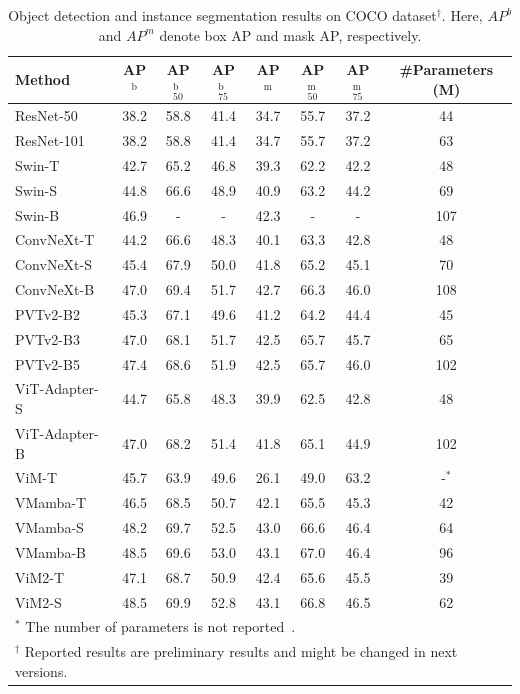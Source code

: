 \documentclass{article}
\begin{document}
\begin{table}[t]
\centering
\caption{{Object detection and instance segmentation results on COCO dataset$^\dagger$}. Here, $AP^{b}$ and $AP^{m}$ denote box AP and mask AP, respectively.
}
\resizebox{.90\linewidth}{!}
{
\begin{tabular}{l ccc ccc c}
\toprule
Method & AP$^\text{b}$ & AP$^\text{b}_\text{50}$ & AP$^\text{b}_\text{75}$ & AP$^\text{m}$ & AP$^\text{m}_\text{50}$ & AP$^\text{m}_\text{75}$ & \#Parameters (M)  \\
\midrule
ResNet-50~\citep{He2016resnet} & 38.2 & 58.8 & 41.4 & 34.7 & 55.7 & 37.2 & 44 \\
ResNet-101~\citep{He2016resnet} & 38.2 & 58.8 & 41.4 & 34.7 & 55.7 & 37.2 & 63 \\
\midrule
Swin-T~\citep{liu2021swin} & 42.7 & 65.2 & 46.8 & 39.3 & 62.2 & 42.2 & 48 \\
Swin-S~\citep{liu2021swin} & 44.8 & 66.6 & 48.9 & 40.9 & 63.2 & 44.2 & 69 \\
Swin-B~\citep{liu2021swin} & 46.9 & - & - & 42.3 & - & - & 107 \\
\midrule
ConvNeXt-T~\citep{liu2022convnet} & 44.2 & 66.6 & 48.3 & 40.1 & 63.3 & 42.8 & 48 \\
ConvNeXt-S~\citep{liu2022convnet} & 45.4 & 67.9 & 50.0 & 41.8 & 65.2 & 45.1 & 70 \\
ConvNeXt-B~\citep{liu2022convnet} & 47.0 & 69.4 & 51.7 & 42.7 & 66.3 & 46.0 & 108 \\
\midrule
PVTv2-B2~\citep{wang2022pvt} & 45.3 & 67.1 & 49.6 & 41.2 & 64.2 & 44.4 & 45 \\
PVTv2-B3~\citep{wang2022pvt} & 47.0 & 68.1 & 51.7 & 42.5 & 65.7 & 45.7 & 65 \\
PVTv2-B5~\citep{wang2022pvt} & 47.4 & 68.6 & 51.9 & 42.5 & 65.7 & 46.0 & 102 \\
\midrule
ViT-Adapter-S~\citep{dosovitskiy2021ViT} & 44.7 & 65.8 & 48.3 & 39.9 & 62.5 & 42.8 & 48 \\
ViT-Adapter-B~\citep{dosovitskiy2021ViT} & 47.0 & 68.2 & 51.4 & 41.8 & 65.1 & 44.9 & 102 \\
\midrule 
ViM-T~\citep{zhu2024ViM} &45.7 & 63.9   & 49.6 & 26.1 & 49.0 & 63.2 & -$^*$ \\
\midrule
VMamba-T~\citep{liu2024vmamba} & 46.5 & 68.5 & 50.7 & 42.1 & 65.5 & 45.3 & 42\\
VMamba-S~\citep{liu2024vmamba} & 48.2 & 69.7 & 52.5 & 43.0 & 66.6 & 46.4 & 64 \\ 
VMamba-B~\citep{liu2024vmamba} & 48.5 & 69.6 & 53.0 & 43.1 & 67.0 & 46.4 & 96 \\
\midrule
\rowcolor{myblue}
ViM2-T & 47.1 & 68.7 & 50.9 & 42.4 & 65.6 & 45.5 & 39 \\
\rowcolor{myblue}
ViM2-S & 48.5 & 69.9 & 52.8 & 43.1 & 66.8 & 46.5 & 62\\
\bottomrule
\multicolumn{8}{l}{$^*$ The number of parameters is not reported~\citep{zhu2024ViM}.}\\
\multicolumn{8}{l}{$^\dagger$ Reported results are preliminary results and might be changed in next versions.}
\end{tabular}
}
\label{tab:coco}
\end{table}
\end{document}
